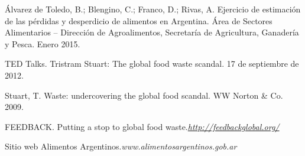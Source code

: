 Álvarez de Toledo, B.; Blengino, C.; Franco, D.; Rivas, A. Ejercicio de
estimación de las pérdidas y desperdicio de alimentos en Argentina. Área
de Sectores Alimentarios -- Dirección de Agroalimentos, Secretaría de
Agricultura, Ganadería y Pesca. Enero 2015.

TED Talks. Tristram Stuart: The global food waste scandal. 17 de
septiembre de 2012.

Stuart, T. Waste: undercovering the global food scandal. WW Norton \&
Co. 2009.

FEEDBACK. Putting a stop to global food
waste.\href{http://feedbackglobal.org/}{\emph{http://feedbackglobal.org/}}

Sitio web Alimentos Argentinos.\emph{www.alimentosargentinos.gob.ar}